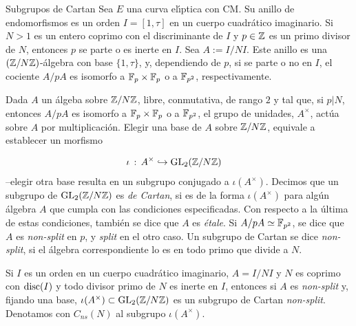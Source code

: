 \begin{subsection}{Subgrupos de Cartan}\label{subsec:subgruposDeCartan}
Sea $E$ una curva el\'{\i}ptica con CM. Su anillo de endomorfismos es un orden
$I=[1,\tau]$ en un cuerpo cuadr\'{a}tico imaginario. Si $N>1$ es un entero coprimo
con el discriminante de $I$ y $p\in\bb{Z}$ es un primo divisor de $N$, entonces
$p$ se parte o es inerte en $I$. Sea $A:=I/NI$. Este anillo es una
$(\bb{Z}/N\bb{Z})$-\'{a}lgebra con base $\{1,\tau\}$, y, dependiendo de $p$, si se
parte o no en $I$, el cociente $A/pA$ es isomorfo a $\bb{F}_{p}\times\bb{F}_{p}$
o a $\bb{F}_{p^{2}}$, respectivamente.

\begin{defSubgrupoDeCartan}\label{thm:defSubgrupoDeCartan}
Dada $A$ un \'{a}lgeba sobre $\bb{Z}/N\bb{Z}$, libre, conmutativa, de rango $2$ y
tal que, si $p|N$, entonces $A/pA$ es isomorfo a $\bb{F}_{p}\times\bb{F}_{p}$ o a
$\bb{F}_{p^{2}}$, el grupo de unidades, $A^{\times}$, act\'{u}a sobre $A$ por
multiplicaci\'{o}n. Elegir una base de $A$ sobre $\bb{Z}/N\bb{Z}$, equivale a
establecer un morfismo

\begin{align*}
\iota & \,:\,A^{\times}\hookrightarrow\GL{2}(\bb{Z}/N\bb{Z})
\end{align*}
--elegir otra base resulta en un subgrupo conjugado a $\iota(A^{\times})$.
Decimos que un subgrupo de $\GL{2}(\bb{Z}/N\bb{Z})$ es \emph{de Cartan}, si es de
la forma $\iota(A^{\times})$ para alg\'{u}n \'{a}lgebra $A$ que cumpla con las
condiciones especificadas. Con respecto a la \'{u}ltima de estas condiciones,
tambi\'{e}n se dice que $A$ es \textit{\'{e}tale}. Si $A/pA\simeq\bb{F}_{p^{2}}$,
se dice que $A$ es \textit{non-split} en $p$, y \textit{split} en el otro caso.
Un subgrupo de Cartan se dice \textit{non-split}, si el \'{a}lgebra correspondiente
lo es en todo primo que divide a $N$.

\end{defSubgrupoDeCartan}

\begin{ejemploSubgrupoDeCartan}\label{thm:ejemploSubgrupoDeCartan}
Si $I$ es un orden en un cuerpo cuadr\'{a}tico imaginario, $A=I/NI$ y
$N$ es coprimo con $\rm{disc}(I)$ y todo divisor primo de $N$ es inerte en $I$, %
entonces si $A$ es \textit{non-split} y, %
fijando una base, $\iota(A^{\times})\subset\GL{2}(\bb{Z}/N\bb{Z})$ es un subgrupo
de Cartan \textit{non-split}. Denotamos con $C_{ns}(N)$ al subgrupo
$\iota(A^{\times})$.


\end{ejemploSubgrupoDeCartan}
\end{subsection}
